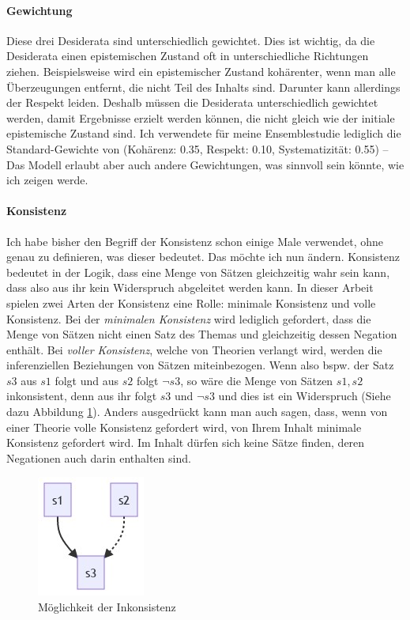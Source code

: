 \documentclass{article}
\begin{document}
\paragraph{Gewichtung} Diese drei Desiderata sind unterschiedlich gewichtet. Dies ist wichtig, da die Desiderata einen epistemischen Zustand oft in unterschiedliche Richtungen ziehen. Beispielsweise wird ein epistemischer Zustand kohärenter, wenn man alle Überzeugungen entfernt, die nicht Teil des Inhalts sind. Darunter kann allerdings der Respekt leiden. Deshalb müssen die Desiderata unterschiedlich gewichtet werden, damit Ergebnisse erzielt werden können, die nicht gleich wie der initiale epistemische Zustand sind. Ich verwendete für meine Ensemblestudie lediglich die Standard-Gewichte von \citeauthor{beisbart_making_2021} (Kohärenz: 0.35, Respekt: 0.10, Systematizität: 0.55) -- Das Modell erlaubt aber auch andere Gewichtungen, was sinnvoll sein könnte, wie ich zeigen werde. \parencite[vgl.][S.~448]{beisbart_making_2021}

\paragraph{Konsistenz\label{konsistenz}}
Ich habe bisher den Begriff der Konsistenz schon einige Male verwendet, ohne genau zu definieren, was dieser bedeutet. Das möchte ich nun ändern. Konsistenz bedeutet in der Logik, dass eine Menge von Sätzen gleichzeitig wahr sein kann, dass also aus ihr kein Widerspruch abgeleitet werden kann. In dieser Arbeit spielen zwei Arten der Konsistenz eine Rolle: minimale Konsistenz und volle Konsistenz. Bei der \textit{minimalen Konsistenz} wird lediglich gefordert, dass die Menge von Sätzen nicht einen Satz des Themas und gleichzeitig dessen Negation enthält. Bei \textit{voller Konsistenz}, welche von Theorien verlangt wird, werden die inferenziellen Beziehungen von Sätzen miteinbezogen. Wenn also bspw. der Satz $s3$ aus $s1$ folgt und aus $s2$ folgt $\neg s3$, so wäre die Menge von Sätzen ${s1,s2}$ inkonsistent, denn aus ihr folgt $s3$ und $\neg s3$ und dies ist ein Widerspruch (Siehe dazu Abbildung \ref{fig:inconsistency}). Anders ausgedrückt kann man auch sagen, dass, wenn von einer Theorie volle Konsistenz gefordert wird, von Ihrem Inhalt minimale Konsistenz gefordert wird. Im Inhalt dürfen sich keine Sätze finden, deren Negationen auch darin enthalten sind.

\begin{figure}[ht]
  \centering
  \includegraphics{consistence.png}
  \caption{Möglichkeit der Inkonsistenz\label{fig:inconsistency}}
\end{figure}
\end{document}
